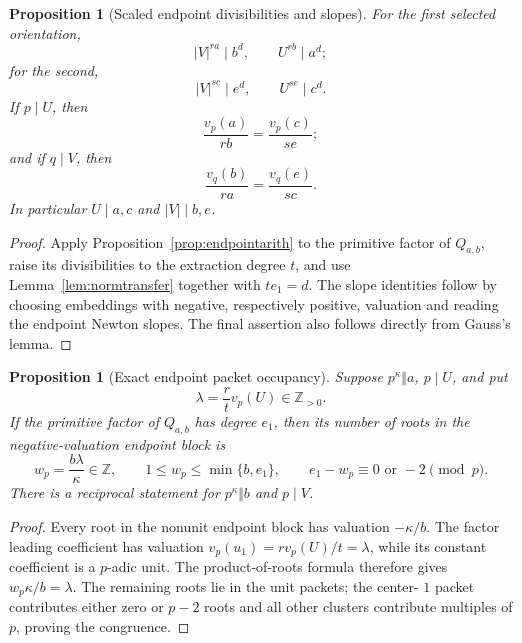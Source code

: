\documentclass[11pt]{article}
\numberwithin{equation}{section}
\newtheorem{proposition}[theorem]{Proposition}
\theoremstyle{definition}
\newcommand{\Z}{\mathbb Z}
\begin{document}
\begin{proposition}[Scaled endpoint divisibilities and slopes]
\label{prop:scaledendpoint}
For the first selected orientation,
\begin{equation}
 |V|^{ra}\mid b^d,\qquad U^{rb}\mid a^d;
 \label{eq:19-4}
\end{equation}
for the second,
\begin{equation}
 |V|^{sc}\mid e^d,\qquad U^{se}\mid c^d.
 \label{eq:19-5}
\end{equation}
If \(p\mid U\), then
\begin{equation}
 \frac{v_p(a)}{rb}=\frac{v_p(c)}{se};
 \label{eq:19-6}
\end{equation}
and if \(q\mid V\), then
\begin{equation}
 \frac{v_q(b)}{ra}=\frac{v_q(e)}{sc}.
 \label{eq:19-7}
\end{equation}
In particular \(U\mid a,c\) and \(|V|\mid b,e\).
\end{proposition}

\begin{proof}
Apply Proposition~\ref{prop:endpointarith} to the primitive factor of
\(Q_{a,b}\), raise its divisibilities to the extraction degree \(t\), and
use Lemma~\ref{lem:normtransfer} together with \(te_1=d\).  The slope
identities follow by choosing embeddings with negative, respectively
positive, valuation and reading the endpoint Newton slopes.  The final
assertion also follows directly from Gauss's lemma.
\end{proof}

\begin{proposition}[Exact endpoint packet occupancy]
\label{prop:packetoccupancy}
Suppose \(p^\kappa\Vert a\), \(p\mid U\), and put
\[
 \lambda=\frac r t v_p(U)\in\Z_{>0}.
\]
If the primitive factor of \(Q_{a,b}\) has degree \(e_1\), then its number
of roots in the negative-valuation endpoint block is
\begin{equation}
 w_p=\frac{b\lambda}{\kappa}\in\Z,
 \qquad 1\leq w_p\leq\min\{b,e_1\},
 \qquad e_1-w_p\equiv0\text{ or }-2\pmod p.
 \label{eq:19-8}
\end{equation}
There is a reciprocal statement for \(p^\kappa\Vert b\) and \(p\mid V\).
\end{proposition}

\begin{proof}
Every root in the nonunit endpoint block has valuation \(-\kappa/b\).
The factor leading coefficient has valuation
\(v_p(u_1)=rv_p(U)/t=\lambda\), while its constant coefficient is a
\(p\)-adic unit.  The product-of-roots formula therefore gives
\(w_p\kappa/b=\lambda\).  The remaining roots lie in the unit packets; the
center-
\(1\) packet contributes either zero or \(p-2\) roots and all other
clusters contribute multiples of \(p\), proving the congruence.
\end{proof}
\end{document}
